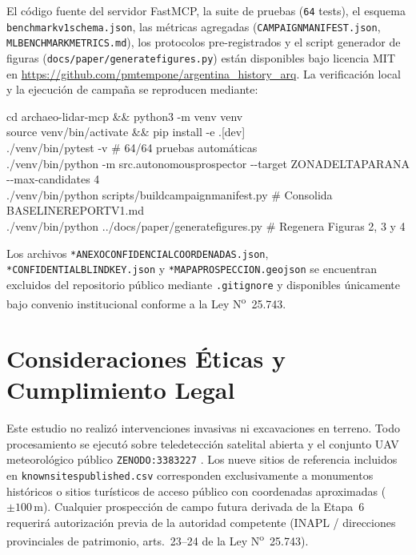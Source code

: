 \documentclass[11pt,a4paper]{article}
\DeclareRobustCommand{\_}{\ifmmode\mbox{\textunderscore}\else\textunderscore\allowbreak\fi}
\begin{document}
El c\'odigo fuente del servidor FastMCP, la suite de pruebas (\texttt{64} tests), el esquema \texttt{benchmark\_v1\_schema.json}, las m\'etricas agregadas (\texttt{CAMPAIGN\_MANIFEST.json}, \texttt{ML\_BENCHMARK\_METRICS.md}), los protocolos pre-registrados y el script generador de figuras (\texttt{docs/paper/generate\_figures.py}) est\'an disponibles bajo licencia MIT en \url{https://github.com/pmtempone/argentina_history_arq}. La verificaci\'on local y la ejecuci\'on de campa\~na se reproducen mediante:

\begin{tcolorbox}[colback=codebg,colframe=slateborder,boxrule=0.5pt,arc=2pt,left=6pt,right=6pt,top=4pt,bottom=4pt]
\raggedright\ttfamily\footnotesize
cd archaeo-lidar-mcp \&\& python3 -m venv venv\\
source venv/bin/activate \&\& pip install -e \textquotedbl{}.[dev]\textquotedbl{}\\
./venv/bin/pytest -v \hfill \# 64/64 pruebas autom\'aticas\\
./venv/bin/python -m src.autonomous\_prospector {-}{-}target ZONA\_23\_DELTA\_PARANA {-}{-}max-candidates 4\\
./venv/bin/python scripts/build\_campaign\_manifest.py \hfill \# Consolida BASELINE\_REPORT\_V1.md\\
./venv/bin/python ../docs/paper/generate\_figures.py \hfill \# Regenera Figuras 2, 3 y 4
\end{tcolorbox}

Los archivos \texttt{*ANEXO\_CONFIDENCIAL\_COORDENADAS.json}, \texttt{*CONFIDENTIAL\_BLIND\_KEY.json} y \texttt{*MAPA\_PROSPECCION\_*.geojson} se encuentran excluidos del repositorio p\'ublico mediante \texttt{.gitignore} y disponibles \'unicamente bajo convenio institucional conforme a la Ley N\textsuperscript{o}~25.743.

\section*{Consideraciones \'Eticas y Cumplimiento Legal}

Este estudio no realiz\'o intervenciones invasivas ni excavaciones en terreno. Todo procesamiento se ejecut\'o sobre teledetecci\'on satelital abierta y el conjunto UAV meteorol\'ogico p\'ublico \texttt{ZENODO:3383227} \citep{Soderholm2019}. Los nueve sitios de referencia incluidos en \texttt{known\_sites\_published.csv} corresponden exclusivamente a monumentos hist\'oricos o sitios tur\'isticos de acceso p\'ublico con coordenadas aproximadas ($\pm 100\,\mathrm{m}$). Cualquier prospecci\'on de campo futura derivada de la Etapa~6 requerir\'a autorizaci\'on previa de la autoridad competente (INAPL / direcciones provinciales de patrimonio, arts.\ 23--24 de la Ley N\textsuperscript{o}~25.743).
\end{document}
